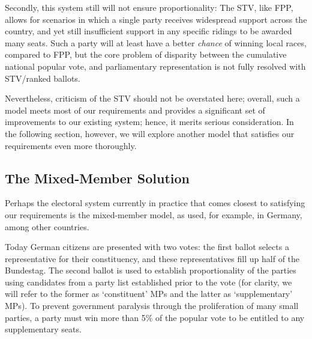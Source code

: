 \documentclass[DIV=calc, paper=a4, fontsize=11pt, twocolumn]{scrartcl}	 %
\begin{document}
Secondly, this system still will not ensure proportionality: The STV, like FPP, allows for scenarios in which a single party receives widespread support across the country, and yet still insufficient support in any specific ridings to be awarded many seats. Such a party will at least have a better \emph{chance} of winning local races, compared to FPP, but the core problem of disparity between the cumulative national popular vote, and parliamentary representation is not fully resolved with STV/ranked ballots.

Nevertheless, criticism of the STV should not be overstated here; 
overall, such a model meets most of our requirements and provides a significant set of improvements to our existing system; hence, it merits serious consideration. In the following section, however, we will explore another model that satisfies our requirements even more thoroughly.


\subsection{The Mixed-Member Solution}
\label{sec:german_model}

Perhaps the electoral system currently in practice that comes closest to satisfying our requirements is the mixed-member model, as used, for example, in Germany, among other countries.

Today German citizens are presented with two votes: the first ballot selects a representative for their constituency, and these representatives fill up half of the Bundestag. The second ballot is used to establish proportionality of the parties using candidates from a party list established prior to the vote
(for clarity, we will refer to the former as `constituent' MPs  and the latter as `supplementary' MPs).
To prevent government paralysis through the proliferation of many small parties, a party must win more than 5\% of the popular vote to be entitled to any supplementary seats.
\end{document}
